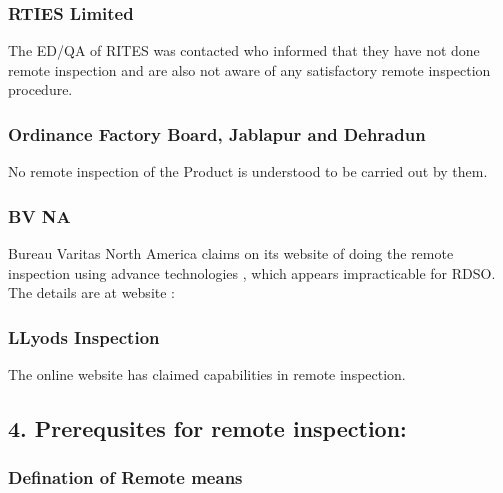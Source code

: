 \documentclass[
]{article}
\begin{document}
\hypertarget{rties-limited}{%
\subsubsection{RTIES Limited}\label{rties-limited}}

The ED/QA of RITES was contacted who informed that they have not done
remote inspection and are also not aware of any satisfactory remote
inspection procedure.

\hypertarget{ordinance-factory-board-jablapur-and-dehradun}{%
\subsubsection{Ordinance Factory Board, Jablapur and
Dehradun}\label{ordinance-factory-board-jablapur-and-dehradun}}

No remote inspection of the Product is understood to be carried out by
them.

\hypertarget{bv-na}{%
\subsubsection{BV NA}\label{bv-na}}

Bureau Varitas North America claims on its website of doing the remote
inspection using advance technologies , which appears impracticable for
RDSO. The details are at website :

\hypertarget{llyods-inspection}{%
\subsubsection{LLyods Inspection}\label{llyods-inspection}}

The online website has claimed capabilities in remote inspection.

\newpage

\hypertarget{prerequsites-for-remote-inspection}{%
\subsection{4. Prerequsites for remote
inspection:}\label{prerequsites-for-remote-inspection}}

\hypertarget{defination-of-remote-means}{%
\subsubsection{Defination of Remote
means}\label{defination-of-remote-means}}
\end{document}

